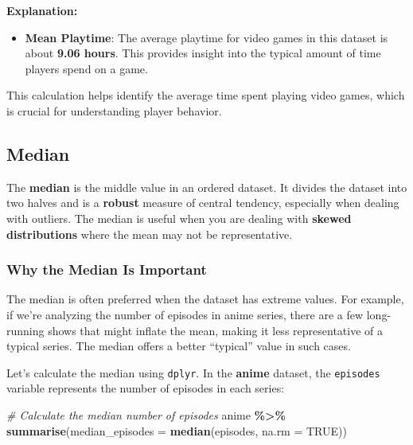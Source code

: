 \documentclass[
]{book}
\newenvironment{Shaded}{\begin{snugshade}}{\end{snugshade}}
\newcommand{\AttributeTok}[1]{\textcolor[rgb]{0.13,0.29,0.53}{#1}}
\newcommand{\CommentTok}[1]{\textcolor[rgb]{0.56,0.35,0.01}{\textit{#1}}}
\newcommand{\ConstantTok}[1]{\textcolor[rgb]{0.56,0.35,0.01}{#1}}
\newcommand{\FunctionTok}[1]{\textcolor[rgb]{0.13,0.29,0.53}{\textbf{#1}}}
\newcommand{\NormalTok}[1]{#1}
\newcommand{\SpecialCharTok}[1]{\textcolor[rgb]{0.81,0.36,0.00}{\textbf{#1}}}
\providecommand{\tightlist}{%
  \setlength{\itemsep}{0pt}\setlength{\parskip}{0pt}}
\begin{document}
\textbf{Explanation:}

\begin{itemize}
\tightlist
\item
  \textbf{Mean Playtime}: The average playtime for video games in this dataset is about \textbf{9.06 hours}. This provides insight into the typical amount of time players spend on a game.
\end{itemize}

This calculation helps identify the average time spent playing video games, which is crucial for understanding player behavior.

\subsection*{Median}\label{median}

The \textbf{median} is the middle value in an ordered dataset. It divides the dataset into two halves and is a \textbf{robust} measure of central tendency, especially when dealing with outliers. The median is useful when you are dealing with \textbf{skewed distributions} where the mean may not be representative.

\subsubsection*{Why the Median Is Important}\label{why-the-median-is-important}

The median is often preferred when the dataset has extreme values. For example, if we're analyzing the number of episodes in anime series, there are a few long-running shows that might inflate the mean, making it less representative of a typical series. The median offers a better ``typical'' value in such cases.

Let's calculate the median using \texttt{dplyr}. In the \textbf{anime} dataset, the \texttt{episodes} variable represents the number of episodes in each series:

\begin{Shaded}
\begin{Highlighting}[]
\CommentTok{\# Calculate the median number of episodes}
\NormalTok{anime }\SpecialCharTok{\%\textgreater{}\%}
  \FunctionTok{summarise}\NormalTok{(}\AttributeTok{median\_episodes =} \FunctionTok{median}\NormalTok{(episodes, }\AttributeTok{na.rm =} \ConstantTok{TRUE}\NormalTok{))}
\end{Highlighting}
\end{Shaded}
\end{document}
